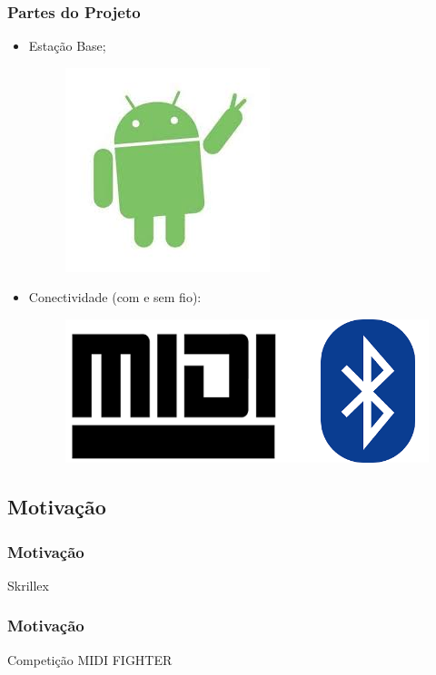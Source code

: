 \documentclass[hyperref={pdfpagelabels=false}]{beamer}
\begin{document}
            \begin{frame}\frametitle{Partes do Projeto}

                \begin{itemize}
                    \item Estação Base;
                        \begin{figure}
                            \includegraphics[scale=0.3]{Imagens/Ideia_de_projeto/android.jpg}
                        \end{figure}
                    \item Conectividade (com e sem fio):
                        \begin{figure}
                            \includegraphics[scale=0.25]{Imagens/Ideia_de_projeto/midi_bluetooth.png}
                        \end{figure}
                \end{itemize}

            \end{frame}

        \subsection{Motivação}

            \begin{frame}\frametitle{Motivação}

                \begin{block}{Skrillex}


                \end{block}

            \end{frame}

            \begin{frame}\frametitle{Motivação}

                \begin{block}{Competição MIDI FIGHTER}

                \end{block}

            \end{frame}
\end{document}
